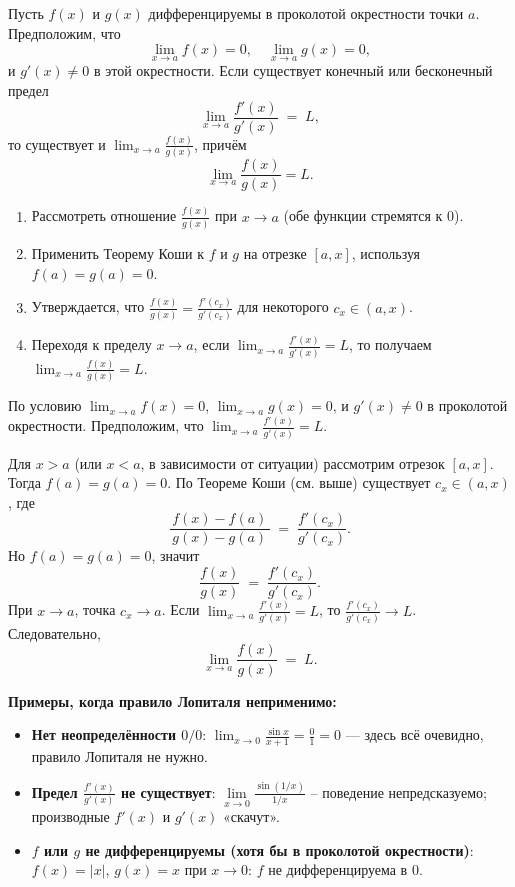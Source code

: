 \begin{customtheorem}
	Пусть $f(x)$ и $g(x)$ дифференцируемы в проколотой окрестности точки $a$.
	Предположим, что
	\[
		\lim_{x\to a} f(x) = 0,\quad
		\lim_{x\to a} g(x)=0,
	\]
	и $g'(x)\neq 0$ в этой окрестности. Если существует конечный или бесконечный предел
	\[
		\lim_{x\to a} \frac{f'(x)}{g'(x)} \;=\; L,
	\]
	то существует и $\lim_{x\to a}\tfrac{f(x)}{g(x)}$, причём
	\[
		\lim_{x\to a}\frac{f(x)}{g(x)}=L.
	\]
\end{customtheorem}

\begin{proofplan}
	\begin{enumerate}
		\item Рассмотреть отношение $\frac{f(x)}{g(x)}$ при $x\to a$ (обе функции стремятся к 0).
		\item Применить Теорему Коши к $f$ и $g$ на отрезке $[a,x]$, используя $f(a)=g(a)=0$.
		\item Утверждается, что $\frac{f(x)}{g(x)}=\frac{f'(c_x)}{g'(c_x)}$ для некоторого $c_x\in(a,x)$.
		\item Переходя к пределу $x\to a$, если $\lim_{x\to a}\frac{f'(x)}{g'(x)}=L$, то получаем $\lim_{x\to a}\frac{f(x)}{g(x)}=L$.
	\end{enumerate}
\end{proofplan}

\begin{customproof}
	По условию $\lim_{x\to a} f(x)=0$, $\lim_{x\to a} g(x)=0$, и $g'(x)\neq 0$ в проколотой окрестности. Предположим, что
	\(\lim_{x\to a}\tfrac{f'(x)}{g'(x)}=L\).

	Для $x>a$ (или $x<a$, в зависимости от ситуации) рассмотрим отрезок $[a,x]$.
	Тогда $f(a)=g(a)=0$. По Теореме Коши (см. выше) существует $c_x\in(a,x)$,
	где
	\[
		\frac{f(x)-f(a)}{\,g(x)-g(a)\,}
		\;=\;
		\frac{f'(c_x)}{g'(c_x)}.
	\]
	Но $f(a)=g(a)=0$, значит
	\[
		\frac{f(x)}{g(x)}
		\;=\;
		\frac{f'(c_x)}{g'(c_x)}.
	\]
	При $x\to a$, точка $c_x\to a$. Если \(\lim_{x\to a}\tfrac{f'(x)}{g'(x)}=L\),
	то \(\tfrac{f'(c_x)}{g'(c_x)}\to L\). Следовательно,
	\[
		\lim_{x\to a} \frac{f(x)}{g(x)}
		\;=\;
		L.
	\]
\end{customproof}

\begin{customexample}
	\textbf{Примеры, когда правило Лопиталя неприменимо:}
	\begin{itemize}
		\item \textbf{Нет неопределённости $0/0$}:
		      $\lim_{x\to 0}\tfrac{\sin x}{x+1}=\tfrac{0}{1}=0$ — здесь всё очевидно,
		      правило Лопиталя не нужно.
		\item \textbf{Предел $\frac{f'(x)}{g'(x)}$ не существует}:
		      $\lim\limits_{x\to 0}\frac{\sin(1/x)}{1/x}$ – поведение непредсказуемо;
		      производные $f'(x)$ и $g'(x)$ «скачут».
		\item \textbf{$f$ или $g$ не дифференцируемы (хотя бы в проколотой окрестности)}:
		      $f(x)=|x|$, $g(x)=x$ при $x\to0$: $f$ не дифференцируема в $0$.
	\end{itemize}
\end{customexample}
